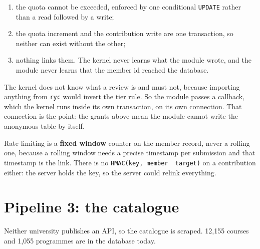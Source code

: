 \documentclass[11pt,a4paper]{article}
\begin{document}
\begin{enumerate}[leftmargin=*]
  \item the quota cannot be exceeded, enforced by one conditional
        \texttt{UPDATE} rather than a read followed by a write;
  \item the quota increment and the contribution write are one transaction, so
        neither can exist without the other;
  \item nothing links them. The kernel never learns what the module wrote, and
        the module never learns that the member id reached the database.
\end{enumerate}

The kernel does not know what a review is and must not, because importing
anything from \texttt{ryc} would invert the tier rule. So the module passes a
callback, which the kernel runs inside its own transaction, on its own
connection. That connection is the point: the grants above mean the module
cannot write the anonymous table by itself.

\begin{careful}
Rate limiting is a \textbf{fixed window} counter on the member record, never a
rolling one, because a rolling window needs a precise timestamp per submission
and that timestamp is the link. There is no
\texttt{HMAC(key, member \textbar\textbar\ target)} on a contribution either:
the server holds the key, so the server could relink everything.
\end{careful}

\newpage
\section{Pipeline 3: the catalogue}

Neither university publishes an API, so the catalogue is scraped. 12{,}155
courses and 1{,}055 programmes are in the database today.

\begin{center}
\end{center}
\end{document}

